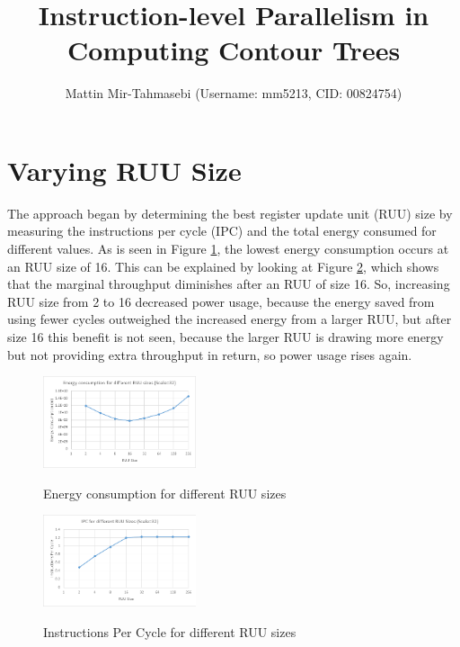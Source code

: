 \documentclass[letterpaper, 10 pt, conference]{ieeeconf}  %
\title{\LARGE \bf
Instruction-level Parallelism in Computing Contour Trees
}
\author{Mattin Mir-Tahmasebi (Username: mm5213, CID: 00824754)}
\begin{document}
\maketitle
\thispagestyle{empty}
\pagestyle{empty}





\section{Varying RUU Size}

The approach began by determining the best register update unit (RUU) size by measuring the instructions per cycle (IPC) and the total energy consumed for different values. As is seen in Figure \ref{fig:energy_ruu}, the lowest energy consumption occurs at an RUU size of 16. This can be explained by looking at Figure \ref{fig:ipc_ruu}, which shows that the marginal throughput diminishes after an RUU of size 16. So, increasing RUU size from 2 to 16 decreased power usage, because the energy saved from using fewer cycles outweighed the increased energy from a larger RUU, but after size 16 this benefit is not seen, because the larger RUU is drawing more energy but not providing extra throughput in return, so power usage rises again.

\begin{figure}[h]
	\begin{center}
	\includegraphics[width=0.4\textwidth]{Energy_RUU.png}\\
  	\caption{Energy consumption for different RUU sizes}
    \label{fig:energy_ruu}
    \end{center}
\end{figure}

\begin{figure}[h]
	\begin{center}
	\includegraphics[width=0.4\textwidth]{IPC_RUU.png}\\
  	\caption{Instructions Per Cycle for different RUU sizes}
    \label{fig:ipc_ruu}
    \end{center}
\end{figure}
\end{document}
